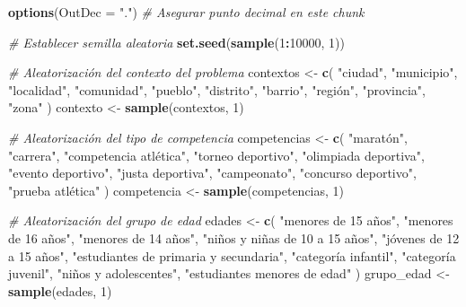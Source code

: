 \documentclass[
]{article}
\author{}
\date{\vspace{-2.5em}}
\newenvironment{Shaded}{\begin{snugshade}}{\end{snugshade}}
\newcommand{\AttributeTok}[1]{\textcolor[rgb]{0.13,0.29,0.53}{#1}}
\newcommand{\CommentTok}[1]{\textcolor[rgb]{0.56,0.35,0.01}{\textit{#1}}}
\newcommand{\DecValTok}[1]{\textcolor[rgb]{0.00,0.00,0.81}{#1}}
\newcommand{\FunctionTok}[1]{\textcolor[rgb]{0.13,0.29,0.53}{\textbf{#1}}}
\newcommand{\NormalTok}[1]{#1}
\newcommand{\OtherTok}[1]{\textcolor[rgb]{0.56,0.35,0.01}{#1}}
\newcommand{\SpecialCharTok}[1]{\textcolor[rgb]{0.81,0.36,0.00}{\textbf{#1}}}
\newcommand{\StringTok}[1]{\textcolor[rgb]{0.31,0.60,0.02}{#1}}
\begin{document}
\begin{Shaded}
\begin{Highlighting}[]
\FunctionTok{options}\NormalTok{(}\AttributeTok{OutDec =} \StringTok{"."}\NormalTok{)  }\CommentTok{\# Asegurar punto decimal en este chunk}

\CommentTok{\# Establecer semilla aleatoria}
\FunctionTok{set.seed}\NormalTok{(}\FunctionTok{sample}\NormalTok{(}\DecValTok{1}\SpecialCharTok{:}\DecValTok{10000}\NormalTok{, }\DecValTok{1}\NormalTok{))}

\CommentTok{\# Aleatorización del contexto del problema}
\NormalTok{contextos }\OtherTok{\textless{}{-}} \FunctionTok{c}\NormalTok{(}
  \StringTok{"ciudad"}\NormalTok{, }\StringTok{"municipio"}\NormalTok{, }\StringTok{"localidad"}\NormalTok{, }\StringTok{"comunidad"}\NormalTok{, }\StringTok{"pueblo"}\NormalTok{,}
  \StringTok{"distrito"}\NormalTok{, }\StringTok{"barrio"}\NormalTok{, }\StringTok{"región"}\NormalTok{, }\StringTok{"provincia"}\NormalTok{, }\StringTok{"zona"}
\NormalTok{)}
\NormalTok{contexto }\OtherTok{\textless{}{-}} \FunctionTok{sample}\NormalTok{(contextos, }\DecValTok{1}\NormalTok{)}

\CommentTok{\# Aleatorización del tipo de competencia}
\NormalTok{competencias }\OtherTok{\textless{}{-}} \FunctionTok{c}\NormalTok{(}
  \StringTok{"maratón"}\NormalTok{, }\StringTok{"carrera"}\NormalTok{, }\StringTok{"competencia atlética"}\NormalTok{, }\StringTok{"torneo deportivo"}\NormalTok{,}
  \StringTok{"olimpiada deportiva"}\NormalTok{, }\StringTok{"evento deportivo"}\NormalTok{, }\StringTok{"justa deportiva"}\NormalTok{,}
  \StringTok{"campeonato"}\NormalTok{, }\StringTok{"concurso deportivo"}\NormalTok{, }\StringTok{"prueba atlética"}
\NormalTok{)}
\NormalTok{competencia }\OtherTok{\textless{}{-}} \FunctionTok{sample}\NormalTok{(competencias, }\DecValTok{1}\NormalTok{)}

\CommentTok{\# Aleatorización del grupo de edad}
\NormalTok{edades }\OtherTok{\textless{}{-}} \FunctionTok{c}\NormalTok{(}
  \StringTok{"menores de 15 años"}\NormalTok{, }\StringTok{"menores de 16 años"}\NormalTok{, }\StringTok{"menores de 14 años"}\NormalTok{,}
  \StringTok{"niños y niñas de 10 a 15 años"}\NormalTok{, }\StringTok{"jóvenes de 12 a 15 años"}\NormalTok{,}
  \StringTok{"estudiantes de primaria y secundaria"}\NormalTok{, }\StringTok{"categoría infantil"}\NormalTok{,}
  \StringTok{"categoría juvenil"}\NormalTok{, }\StringTok{"niños y adolescentes"}\NormalTok{, }\StringTok{"estudiantes menores de edad"}
\NormalTok{)}
\NormalTok{grupo\_edad }\OtherTok{\textless{}{-}} \FunctionTok{sample}\NormalTok{(edades, }\DecValTok{1}\NormalTok{)}


\end{Highlighting}
\end{Shaded}
\end{document}
